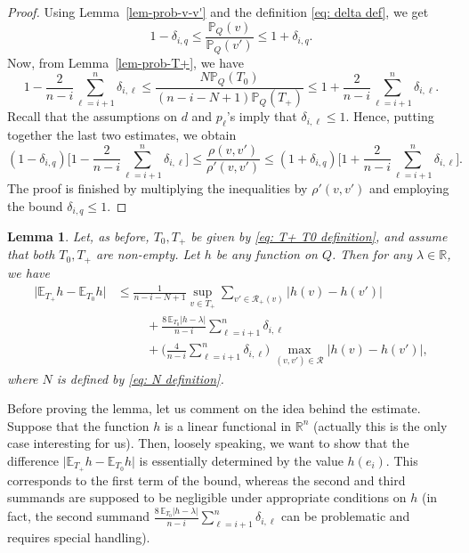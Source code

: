 \documentclass[12pt]{article}
\newtheorem{lemma}[theorem]{Lemma}
\theoremstyle{definition}
\theoremstyle{plain}
\newcommand{\E}{\mathbb{E}}
\newcommand{\R}{\mathbb{R}}
\def\Prob{{\mathbb P}}
\def\relation{{\mathcal R}}
\begin{document}
\begin{proof}
Using Lemma~\ref{lem-prob-v-v'} and the definition \eqref{eq: delta def}, we get 
$$
1-\delta_{i,q}\leq\frac{\Prob_Q(v)}{\Prob_Q(v')}\leq 1+\delta_{i,q}.
$$
Now, from Lemma~\ref{lem-prob-T+}, we have
$$
1-\frac{2}{n-i} \sum_{\ell=i+1}^n \delta_{i,\ell}
\leq \frac{N\Prob_Q(T_0)}{(n-i-N+1)\Prob_Q(T_+)}\leq 1+\frac{2}{n-i} \sum_{\ell=i+1}^n \delta_{i,\ell}.
$$
Recall that the assumptions on $d$ and $p_\ell$'s imply that $\delta_{i,\ell}\leq 1$.
Hence, putting together the last two estimates, we obtain
$$
(1-\delta_{i,q})\Big[1-\frac{2}{n-i} \sum_{\ell=i+1}^n \delta_{i,\ell}\Big]\leq \frac{\rho(v,v')}{\rho'(v,v')}\leq 
(1+\delta_{i,q})\Big[1+\frac{2}{n-i} \sum_{\ell=i+1}^n \delta_{i,\ell}\Big].
$$
The proof is finished by multiplying the inequalities by $\rho'(v,v')$ and employing the bound $\delta_{i,q}\leq 1$.
\end{proof}

\begin{lemma}\label{lem-h-T+}
Let, as before, $T_0,T_+$ be given by \eqref{eq: T+ T0 definition}, and
assume that both $T_0,T_+$ are non-empty. Let
$h$ be any function on $Q$. Then for any $\lambda\in\R$, we have
\begin{align*}
\vert \E_{T_+} h-\E_{T_0} h\vert
&\leq\frac{1}{n-i-N+1}\sup\limits_{v\in T_+}\sum\limits_{v'\in \relation_+(v)}\big|h(v)-h(v')\big|\\
&\hspace{1cm}+\frac{8\,\E_{T_0}|h-\lambda|}{n-i} \sum_{\ell=i+1}^n \delta_{i,\ell}\\
&\hspace{1cm}+\Big(\frac{4}{n-i} \sum_{\ell=i+1}^n \delta_{i,\ell}\Big)\, \max_{(v,v')\in \relation} \big\vert h(v)-h(v')\big\vert,
\end{align*}
where $N$ is defined by \eqref{eq: N definition}.
\end{lemma}

Before proving the lemma, let us comment on the idea behind the estimate.
Suppose that the function $h$ is a linear functional in $\R^n$ (actually this is the only
case interesting for us). Then, loosely speaking, we want to show that the difference
$\vert \E_{T_+} h-\E_{T_0} h\vert$ is essentially determined by the value $h(e_i)$.
This corresponds to the first term of the bound, whereas the second and third summands are
supposed to be negligible under appropriate conditions on $h$
(in fact, the second summand $\frac{8\,\E_{T_0}|h-\lambda|}{n-i} \sum_{\ell=i+1}^n \delta_{i,\ell}$
can be problematic and requires special handling).
\end{document}
